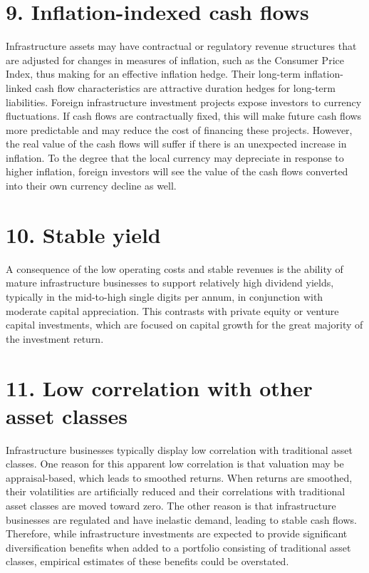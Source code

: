 \documentclass[11pt]{article}
\begin{document}
\section*{9. Inflation-indexed cash flows}
Infrastructure assets may have contractual or regulatory revenue structures that are adjusted for changes in measures of inflation, such as the Consumer Price Index, thus making for an effective inflation hedge. Their long-term inflation-linked cash flow characteristics are attractive duration hedges for long-term liabilities. Foreign infrastructure investment projects expose investors to currency fluctuations. If cash flows are contractually fixed, this will make future cash flows more predictable and may reduce the cost of financing these projects. However, the real value of the cash flows will suffer if there is an unexpected increase in inflation. To the degree that the local currency may depreciate in response to higher inflation, foreign investors will see the value of the cash flows converted into their own currency decline as well.

\section*{10. Stable yield}
A consequence of the low operating costs and stable revenues is the ability of mature infrastructure businesses to support relatively high dividend yields, typically in the mid-to-high single digits per annum, in conjunction with moderate capital appreciation. This contrasts with private equity or venture capital investments, which are focused on capital growth for the great majority of the investment return.

\section*{11. Low correlation with other asset classes}
Infrastructure businesses typically display low correlation with traditional asset classes. One reason for this apparent low correlation is that valuation may be appraisal-based, which leads to smoothed returns. When returns are smoothed, their volatilities are artificially reduced and their correlations with traditional asset classes are moved toward zero. The other reason is that infrastructure businesses are regulated and have inelastic demand, leading to stable cash flows. Therefore, while infrastructure investments are expected to provide significant diversification benefits when added to a portfolio consisting of traditional asset classes, empirical estimates of these benefits could be overstated.
\end{document}
